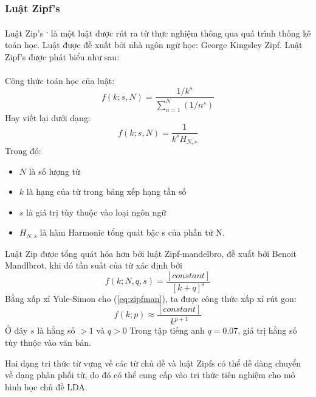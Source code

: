 \documentclass[fontsize=13pt]{scrartcl}
\begin{document}
\subsubsection{Luật Zipf’s}
Luật Zip’s \textsuperscript{\cite{zipf2},\cite{zipflaw}} là một luật được rút ra từ thực nghiệm thông qua quá trình thống kê toán học. Luật được đề xuất bởi nhà ngôn ngữ học: George Kingsley Zipf. Luật Zipf’s được phát biểu như sau:\\[0.4cm]
\\[.4cm]
 Công thức toán học của luật:
\begin{equation}
f(k;s,N) = \frac{1/k^s}{\sum_{n=1}^N(1/n^s)}
\end{equation}
Hay viết lại dưới dạng:
\begin{equation}
f(k;s,N) = \frac{1}{k^sH_{N,s}}
\end{equation}
Trong đó:
\begin{center}
\begin{itemize}
\item $N$ là số lượng từ
\item $k$ là hạng của từ trong bảng xếp hạng tần số
\item $s$ là giá trị tùy thuộc vào loại ngôn ngữ
\item $H_{N,s}$ là hàm Harmonic tổng quát bậc s của phần tử N.
\end{itemize}
\end{center}

Luật Zip được tổng quát hóa hơn bởi luật Zipf-mandelbro, đề xuất bởi Benoit Mandlbrot, khi đó tần suất của từ xác định bởi
\begin{equation} \label{eq:zipfman}
f(k;N,q,s) = \frac{[constant]}{[k+q]^s}
\end{equation}
Bằng xấp xỉ Yule-Simon cho (\ref{eq:zipfman}), ta được công thức xấp xỉ rút gon:
\begin{equation}\label{eq:zipex}
f(k;p) \approx \frac{[constant]}{k^{p+1}}
\end{equation}
Ở đây $s$ là hằng số $>1$ và $q>0$
Trong tập tiếng anh  $q = 0.07$, giá trị hằng số tùy thuộc vào văn bản.
\par
Hai dạng tri thức từ vựng về các từ chủ đề và luật Zipfs có thể dễ dàng chuyển về dạng phân phối từ, do đó có thể cung cấp vào tri thức tiên nghiệm cho mô hình học chủ đề LDA.
\end{document}
